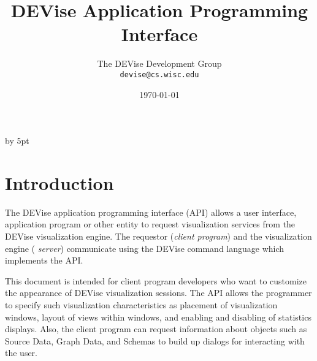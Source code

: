 %

%


\renewcommand{\topfraction}{1.0}
\renewcommand{\bottomfraction}{1.0}
\renewcommand{\textfraction}{0.0}
\advance\intextsep by 5pt

\def\filename#1{{\tt #1}}
\def\code#1{{\tt #1}}
\def\menu#1{{\tt #1}}
\def\term#1{#1}
\def\variable#1{{\tt #1}}

\def\scaleepspic[#1]#2#3{
\begin{figure}[htb]
\centering\leavevmode\epsfxsize=#1\epsfbox{#2}
\caption{#3}
\end{figure}
}

\def\fullepspic#1#2{
\begin{figure}[htb]
\centering\leavevmode\epsfxsize=\textwidth\epsfbox{#1}
\caption{#2}
\end{figure}
}


\title{DEVise Application Programming Interface}
\author{The DEVise Development Group \\
\code{devise@cs.wisc.edu}
}
\date{\today}
\maketitle

\section{Introduction}

The DEVise application programming interface (API) allows a user
interface, application program or other entity to request
visualization services from the DEVise visualization engine. The
requestor ({\em client program}) and the visualization engine ({\em
server}) communicate using the DEVise command language which
implements the API.

This document is intended for client program developers who want to
customize the appearance of DEVise visualization sessions. The API
allows the programmer to specify such visualization characteristics as
placement of visualization windows, layout of views within windows,
and enabling and disabling of statistics displays. Also, the client
program can request information about objects such as Source Data,
Graph Data, and Schemas to build up dialogs for interacting with the
user.

